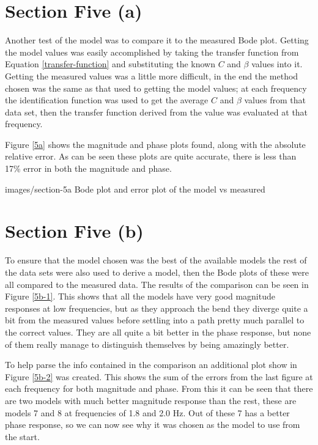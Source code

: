 \section*{Section Five (a)}

Another test of the model was to compare it to the measured Bode plot.  Getting
the model values was easily accomplished by taking the transfer function from
Equation \eqref{transfer-function} and substituting the known $C$ and $\beta$
values into it.  Getting the measured values was a little more difficult, in the
end the method chosen was the same as that used to getting the model values; at
each frequency the identification function was used to get the average $C$ and
$\beta$ values from that data set, then the transfer function derived from the
value was evaluated at that frequency.

Figure \ref{5a} shows the magnitude and phase plots found, along with the
absolute relative error.  As can be seen these plots are quite accurate, there
is less than 17\% error in both the magnitude and phase.

              {images/section-5a}
              {Bode plot and error plot of the model vs measured\label{5a}}

\section*{Section Five (b)}

To ensure that the model chosen was the best of the available models the rest of
the data sets were also used to derive a model, then the Bode plots of these
were all compared to the measured data.  The results of the comparison can be
seen in Figure \ref{5b-1}.  This shows that all the models have very good
magnitude responses at low frequencies, but as they approach the bend they
diverge quite a bit from the measured values before settling into a path pretty
much parallel to the correct values.  They are all quite a bit better in the
phase response, but none of them really manage to distinguish themselves by
being amazingly better.

To help parse the info contained in the comparison an additional plot show in
Figure \ref{5b-2} was created.  This shows the sum of the errors from the last
figure at each frequency for both magnitude and phase.  From this it can be seen
that there are two models with much better magnitude response than the rest,
these are models 7 and 8 at frequencies of 1.8 and 2.0 Hz.  Out of these 7 has a
better phase response, so we can now see why it was chosen as the model to use
from the start.

